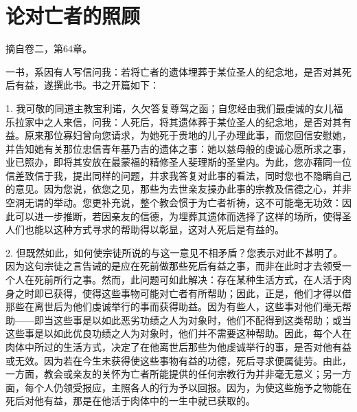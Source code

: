 
\chapter{论对亡者的照顾}


摘自卷二，第64章。\par

一书，系因有人写信问我：若将亡者的遗体埋葬于某位圣人的纪念地，是否对其死后有益，遂撰此书。书之开篇如下：\newline{}\par

1. 我可敬的同道主教宝利诺，久欠答复尊驾之函；自您经由我们最虔诚的女儿福乐拉家中之人来信，问我：人死后，将其遗体葬于某位圣人的纪念地，是否对其有益。原来那位寡妇曾向您请求，为她死于贵地的儿子办理此事，而您回信安慰她，并告知她有关那位忠信青年基乃吉的遗体之事：她以慈母般的虔诚心愿所求之事，业已照办，即将其安放在最蒙福的精修圣人斐理斯的圣堂内。为此，您亦藉同一位信差致信于我，提出同样的问题，并求我答复对此事的看法，同时您也不隐瞒自己的意见。因为您说，依您之见，那些为去世亲友操办此事的宗教及信德之心，并非空洞无谓的举动。您更补充说，整个教会惯于为亡者祈祷，这不可能毫无功效：因此可以进一步推断，若因亲友的信德，为埋葬其遗体而选择了这样的场所，使得圣人们也能以这种方式寻求的帮助得以彰显，这对人死后是有益的。\par

2. 但既然如此，如何使宗徒所说的与这一意见不相矛盾？您表示对此不甚明了。因为这句宗徒之言告诫的是应在死前做那些死后有益之事，而非在此时才去领受一个人在死前所行之事。然而，此问题可如此解决：存在某种生活方式，在人活于肉身之时即已获得，使得这些事物可能对亡者有所帮助；因此，正是，他们才得以借那些在离世后为他们虔诚举行的事而获得助益。因为有些人，这些事对他们毫无帮助——即当这些事是以如此恶劣功绩之人为对象时，他们不配得到这类帮助；或当这些事是以如此优良功绩之人为对象时，他们并不需要这种帮助。因此，每个人在肉体中所过的生活方式，决定了在他离世后那些为他虔诚举行的事，是否对他有益或无效。因为若在今生未获得使这些事物有益的功德，死后寻求便属徒劳。由此，一方面，教会或亲友的关怀为亡者所能提供的任何宗教行为并非毫无意义；另一方面，每个人仍领受报应，主照各人的行为予以回报。因为，为使这些施予之物能在死后对他有益，那是在他活于肉体中的一生中就已获取的。\par


